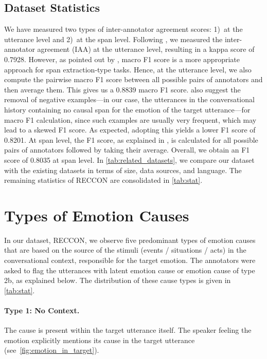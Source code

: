 \documentclass[11pt,a4paper]{article}
\theoremstyle{definition}
\newcommand\RECCONDA{RECCON}
\begin{document}
\subsection{Dataset Statistics}

We have measured two types of inter-annotator agreement scores: 1)~at the utterance level and 2)~at the span level.
Following \citet{gui2016event}, we measured the inter-annotator agreement (IAA) at the utterance level, resulting in a kappa score of 0.7928. 
However, as pointed out by \citet{brandsen-etal-2020-creating}, macro F1 score is a more appropriate approach for span extraction-type tasks. Hence, at the utterance level, we also compute the pairwise macro F1 score between all possible pairs of annotators and then average them. This gives us a 0.8839 macro F1 score. \citet{brandsen-etal-2020-creating} also suggest the removal of negative examples---in our case, the utterances in the conversational history containing no causal span for the emotion of the target utterance---for macro F1 calculation, since such examples are usually very frequent, which may lead to a skewed F1 score. As expected, adopting this yields a lower F1 score of 0.8201. At span level, the F1 score, as explained in \citet{rajpurkar2016squad}, is calculated for all possible pairs of annotators followed by taking their average. Overall, we obtain an F1 score of 0.8035 at span level.
In \cref{tab:related_datasets}, we compare our dataset with the existing datasets in terms of size, data sources, and language. The remaining statistics of \RECCONDA{} are consolidated in \cref{tab:stat}.









\section{Types of Emotion Causes}
\label{sec:types}
In our dataset, \RECCONDA{}, we observe five predominant types of emotion causes that are based on the source of the stimuli (events / situations / acts) in the conversational context, responsible for the target emotion. 
The annotators were asked to flag the utterances with latent emotion cause or emotion cause of type 2b, as explained below.
The distribution of these cause types is given in \cref{tab:stat}.

\paragraph{Type 1: No Context.} The cause is present within the target utterance itself. The speaker feeling the emotion explicitly mentions its cause in the target utterance (see~\cref{fig:emotion_in_target}).
 
\end{document}
